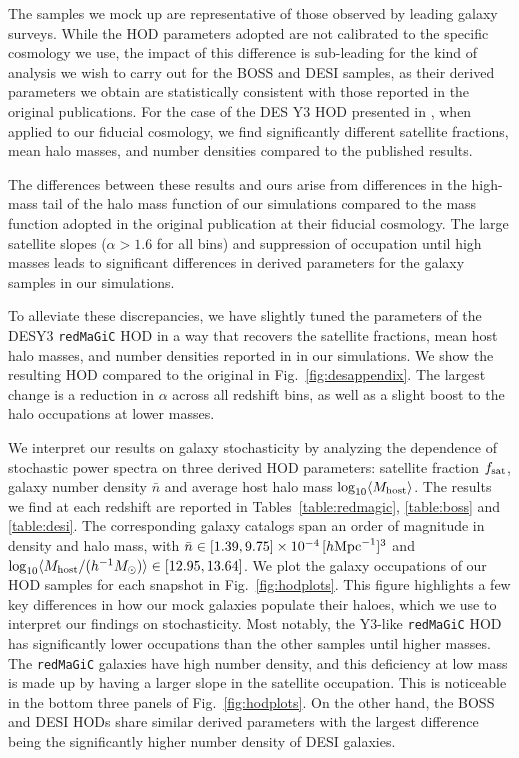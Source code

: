 \documentclass[fleqn,usenatbib]{mnras}
\newcommand{\redmagic}{\texttt{redMaGiC} }
\begin{document}
The samples we mock up are representative of those observed by leading galaxy surveys.  While the HOD parameters adopted are not calibrated to the specific cosmology we use, the impact of this difference is sub-leading for the kind of analysis we wish to carry out for the BOSS and DESI samples, as their derived parameters we obtain are statistically consistent with those reported in the original publications. For the case of the DES Y3 HOD presented in \cite{zacharegkas2021dark}, when applied to our fiducial cosmology, we find significantly different satellite fractions, mean halo masses, and number densities compared to the published results. \par 
The differences between these results and ours arise from differences in the high-mass tail of the halo mass function of our simulations compared to the \cite{Tinker:2008ff} mass function adopted in the original publication at their fiducial cosmology. The large satellite slopes ($\alpha > 1.6$ for all bins) and suppression of occupation until high masses leads to significant differences in derived parameters for the galaxy samples in our simulations. \par 
To alleviate these discrepancies, we have slightly tuned the parameters of the DESY3 \redmagic HOD in a way that recovers the satellite fractions, mean host halo masses, and number densities reported in \cite{zacharegkas2021dark} in our simulations. We show the resulting HOD compared to the original in Fig.~\ref{fig:desappendix}. The largest change is a reduction in $\alpha$ across all redshift bins, as well as a slight boost to the halo occupations at lower masses. \par 
We interpret our results on galaxy stochasticity by analyzing the dependence of  stochastic power spectra on three derived HOD parameters: satellite fraction $f_{\rm sat}$, galaxy number density $\bar{n}$ and average host halo mass $\log_{10} \langle M_{\rm host} \rangle$. The results we find at each redshift are reported in Tables~\ref{table:redmagic}, \ref{table:boss} and \ref{table:desi}. The corresponding galaxy catalogs span an order of magnitude in density and halo mass, with $\bar{n} \in [1.39, 9.75] \times 10^{-4} \, [h {\rm Mpc}^{-1}]^3$ and $\log_{10} \langle M_{\rm host} / (h^{-1} M_\odot) \rangle \in [12.95, 13.64]$. We plot the galaxy occupations of our HOD samples for each snapshot in Fig.~\ref{fig:hodplots}. This figure highlights a few key differences in how our mock galaxies populate their haloes, which we use to interpret our findings on stochasticity. Most notably, the Y3-like \redmagic HOD has significantly lower occupations than the other samples until higher masses. The \redmagic galaxies have high number density, and this deficiency at low mass is made up by having a larger slope in the satellite occupation. This is noticeable in the bottom three panels of Fig.~\ref{fig:hodplots}. On the other hand, the BOSS and DESI HODs share similar derived parameters with the largest difference being the significantly higher number density of DESI galaxies.\par 
\end{document}
